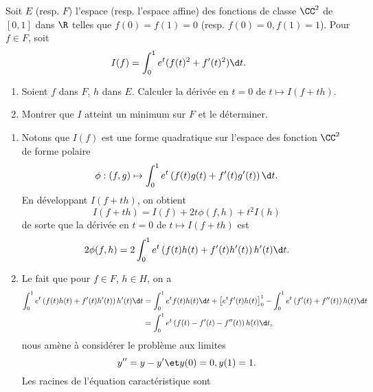 \begin{enonce}
\begin{exercise}[ID={RMS120 E225, X-MP 2009},subtitle={},tags={}]
Soit $E$ (resp. $F$) l'espace (resp. l'espace affine) des fonctions de classe $\CC^2$ de $[0,1]$ dans $\R$ telles que $f(0)=f(1)=0$ (resp. $f(0)=0, f(1)=1$).
Pour $f\in F$, soit
\begin{equation*}
I(f) = \int_0^1 e^t(f(t)^2+f'(t)^2)\d t.
\end{equation*}
\begin{enumerate}
\item Soient $f$ dans $F$, $h$ dans $E$. Calculer la dérivée en $t=0$ de $t\mapsto I(f+th)$.
\item Montrer que $I$ atteint un minimum sur $F$ et le déterminer.
\end{enumerate}
\end{exercise}
\begin{solution}
\begin{enumerate}
\item  Notons que $I(f)$ est une forme quadratique sur l'espace des fonction $\CC^2$ de forme polaire
\begin{equation*}
\phi : (f,g)\mapsto \int_0^1 e^t \left(f(t)g(t)+f'(t)g'(t)\right) \d t.
\end{equation*}
En développant $I(f+th)$, on obtient
\begin{equation*}
    I(f+th)=I(f)+2t\phi(f,h)+t^2 I(h)
\end{equation*}
de sorte que la dérivée en $t=0$ de $t\mapsto I(f+th)$ est
\begin{equation*}
    2\phi(f,h)=2\int_0^1 e^t \left( f(t)h(t) + f'(t)h'(t) \right) h'(t)\d t.
\end{equation*}
\item Le fait que pour $f\in F$, $h\in H$, on a
\begin{align*}
\int_0^1 e^t \left(  f(t)h(t) + f'(t)h'(t) \right) h'(t)\d t
&= \int_0^1 e^t f(t)h(t)\d t + \left[ e^t f'(t)h(t)\right]_0^1 - \int_0^1 e^t\left( f'(t)+f''(t) \right) h(t)\d t\\
&= \int_0^1 e^t \left(f(t)-f'(t)-f''(t)\right) h(t) \d t,
\end{align*}
nous amène à considérer le problème aux limites
\begin{equation}
    y''=y-y' \et y(0)=0, y(1)=1.
\end{equation}
Les racines de l'équation caractéristique sont
\begin{equation*}

\end{equation*}
\end{enumerate}
\end{solution}
\end{enonce}
